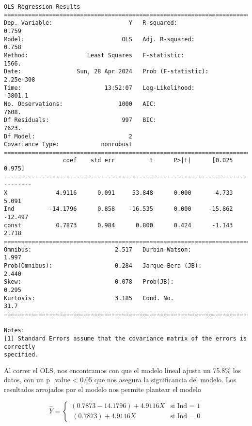 \documentclass[11pt]{article}
\begin{document}
    \begin{Verbatim}[commandchars=\\\{\}]
                            OLS Regression Results
==============================================================================
Dep. Variable:                      Y   R-squared:                       0.759
Model:                            OLS   Adj. R-squared:                  0.758
Method:                 Least Squares   F-statistic:                     1566.
Date:                Sun, 28 Apr 2024   Prob (F-statistic):          2.25e-308
Time:                        13:52:07   Log-Likelihood:                -3801.1
No. Observations:                1000   AIC:                             7608.
Df Residuals:                     997   BIC:                             7623.
Df Model:                           2
Covariance Type:            nonrobust
==============================================================================
                 coef    std err          t      P>|t|      [0.025      0.975]
------------------------------------------------------------------------------
X              4.9116      0.091     53.848      0.000       4.733       5.091
Ind          -14.1796      0.858    -16.535      0.000     -15.862     -12.497
const          0.7873      0.984      0.800      0.424      -1.143       2.718
==============================================================================
Omnibus:                        2.517   Durbin-Watson:                   1.997
Prob(Omnibus):                  0.284   Jarque-Bera (JB):                2.440
Skew:                           0.078   Prob(JB):                        0.295
Kurtosis:                       3.185   Cond. No.                         31.7
==============================================================================

Notes:
[1] Standard Errors assume that the covariance matrix of the errors is correctly
specified.
    \end{Verbatim}

    Al correr el OLS, nos encontramos con que el modelo lineal ajusta un
75.8\% los datos, con un p\_value \textless{} 0.05 que nos asegura la
significancia del modelo. Los resultados arrojados por el modelo nos
permite plantear el modelo

\[ \hat{Y} = \left\{ 
    \begin{array}{ll} (0.7873-14.1796) + 4.9116X & \text{si  Ind = 1} \\
    \ (0.7873) + 4.9116X & \text {si  Ind = 0} \end{array} \right. \]
\end{document}
